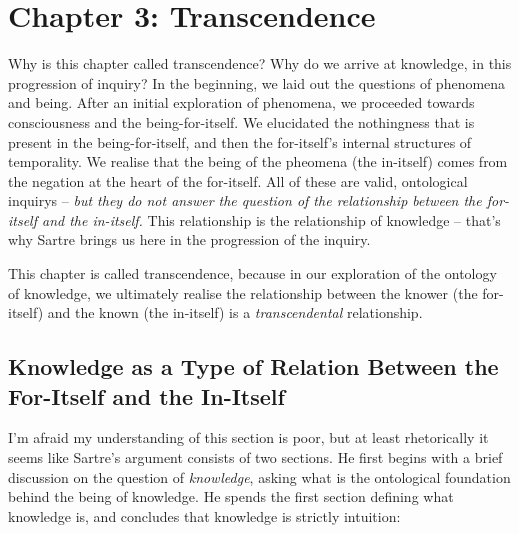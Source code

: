 \section{Chapter 3: Transcendence}

Why is this chapter called transcendence? Why do we arrive at knowledge, in this progression of inquiry? In the beginning, we laid out the questions of phenomena and being. After an initial exploration of phenomena, we proceeded towards consciousness and the being-for-itself. We elucidated the nothingness that is present in the being-for-itself, and then the for-itself's internal structures of temporality. We realise that the being of the pheomena (the in-itself) comes from the negation at the heart of the for-itself. All of these are valid, ontological inquirys -- \emph{but they do not answer the question of the relationship between the for-itself and the in-itself.} This relationship is the relationship of knowledge -- that's why Sartre brings us here in the progression of the inquiry.

\noindent
This chapter is called transcendence, because in our exploration of the ontology of knowledge, we ultimately realise the relationship between the knower (the for-itself) and the known (the in-itself) is a \emph{transcendental} relationship.

\subsection{Knowledge as a Type of Relation Between the For-Itself and the In-Itself}

I'm afraid my understanding of this section is poor, but at least rhetorically it seems like Sartre's argument consists of two sections. He first begins with a brief discussion on the question of \emph{knowledge}, asking what is the ontological foundation behind the being of knowledge. He spends the first section defining what knowledge is, and concludes that knowledge is strictly intuition:

